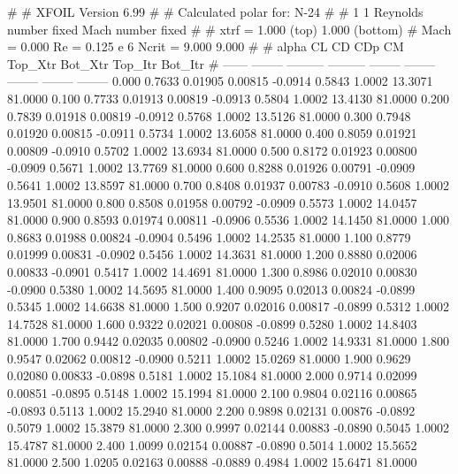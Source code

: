 #  
#       XFOIL         Version 6.99
#  
# Calculated polar for: N-24                                            
#  
# 1 1 Reynolds number fixed          Mach number fixed         
#  
# xtrf =   1.000 (top)        1.000 (bottom)  
# Mach =   0.000     Re =     0.125 e 6     Ncrit =   9.000  9.000
#  
#   alpha    CL        CD       CDp       CM     Top_Xtr  Bot_Xtr  Top_Itr  Bot_Itr
#  ------ -------- --------- --------- -------- -------- -------- -------- --------
   0.000   0.7633   0.01905   0.00815  -0.0914   0.5843   1.0002  13.3071  81.0000
   0.100   0.7733   0.01913   0.00819  -0.0913   0.5804   1.0002  13.4130  81.0000
   0.200   0.7839   0.01918   0.00819  -0.0912   0.5768   1.0002  13.5126  81.0000
   0.300   0.7948   0.01920   0.00815  -0.0911   0.5734   1.0002  13.6058  81.0000
   0.400   0.8059   0.01921   0.00809  -0.0910   0.5702   1.0002  13.6934  81.0000
   0.500   0.8172   0.01923   0.00800  -0.0909   0.5671   1.0002  13.7769  81.0000
   0.600   0.8288   0.01926   0.00791  -0.0909   0.5641   1.0002  13.8597  81.0000
   0.700   0.8408   0.01937   0.00783  -0.0910   0.5608   1.0002  13.9501  81.0000
   0.800   0.8508   0.01958   0.00792  -0.0909   0.5573   1.0002  14.0457  81.0000
   0.900   0.8593   0.01974   0.00811  -0.0906   0.5536   1.0002  14.1450  81.0000
   1.000   0.8683   0.01988   0.00824  -0.0904   0.5496   1.0002  14.2535  81.0000
   1.100   0.8779   0.01999   0.00831  -0.0902   0.5456   1.0002  14.3631  81.0000
   1.200   0.8880   0.02006   0.00833  -0.0901   0.5417   1.0002  14.4691  81.0000
   1.300   0.8986   0.02010   0.00830  -0.0900   0.5380   1.0002  14.5695  81.0000
   1.400   0.9095   0.02013   0.00824  -0.0899   0.5345   1.0002  14.6638  81.0000
   1.500   0.9207   0.02016   0.00817  -0.0899   0.5312   1.0002  14.7528  81.0000
   1.600   0.9322   0.02021   0.00808  -0.0899   0.5280   1.0002  14.8403  81.0000
   1.700   0.9442   0.02035   0.00802  -0.0900   0.5246   1.0002  14.9331  81.0000
   1.800   0.9547   0.02062   0.00812  -0.0900   0.5211   1.0002  15.0269  81.0000
   1.900   0.9629   0.02080   0.00833  -0.0898   0.5181   1.0002  15.1084  81.0000
   2.000   0.9714   0.02099   0.00851  -0.0895   0.5148   1.0002  15.1994  81.0000
   2.100   0.9804   0.02116   0.00865  -0.0893   0.5113   1.0002  15.2940  81.0000
   2.200   0.9898   0.02131   0.00876  -0.0892   0.5079   1.0002  15.3879  81.0000
   2.300   0.9997   0.02144   0.00883  -0.0890   0.5045   1.0002  15.4787  81.0000
   2.400   1.0099   0.02154   0.00887  -0.0890   0.5014   1.0002  15.5652  81.0000
   2.500   1.0205   0.02163   0.00888  -0.0889   0.4984   1.0002  15.6471  81.0000
